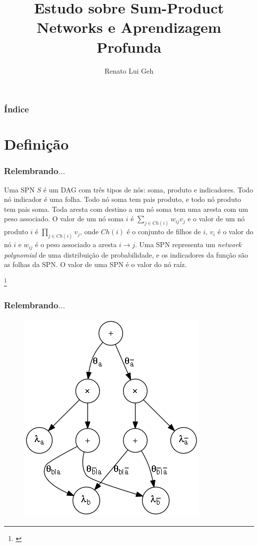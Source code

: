 \documentclass[10pt]{beamer}
\title{Estudo sobre Sum-Product Networks e Aprendizagem Profunda}
\author{Renato Lui Geh}
\institute[IME-USP] {%
  Instituto de Matemática e Estatística\\
  Universidade de São Paulo
}
\newcommand\nmfootnote[1]{%
  \begingroup
  \renewcommand\thefootnote{}\footnote{#1}%
  \addtocounter{footnote}{-1}%
  \endgroup
}
\theoremstyle{plain}
\begin{document}
\frame{\titlepage}

\begin{frame}
  \frametitle{Índice}
  \tableofcontents
\end{frame}


\section{Definição}

\begin{frame}
  \frametitle{Relembrando$\ldots$}
  \begin{definition}\label{pd-def}
    Uma SPN $S$ é um DAG com três tipos de nós: soma, produto e indicadores. Todo nó indicador é uma
    folha. Todo nó soma tem pais produto, e todo nó produto tem pais soma. Toda aresta com destino a
    um nó soma tem uma aresta com um peso associado. O valor de um nó soma $i$ é $\sum_{j\in Ch(i)}
    w_{ij}v_j$ e o valor de um nó produto $i$ é $\prod_{j\in Ch(i)}v_j$, onde $Ch(i)$ é o conjunto
    de filhos de $i$, $v_i$ é o valor do nó $i$ e $w_{ij}$ é o peso associado a aresta $i\to j$. Uma
    SPN representa um \emph{network polynomial} de uma distribuição de probabilidade, e os
    indicadores da função são as folhas da SPN\@. O valor de uma SPN é o valor do nó raíz.
  \end{definition}\nmfootnote{\cite{poon-domingos}}
\end{frame}

\begin{frame}
  \frametitle{Relembrando$\ldots$}
  \begin{figure}[h]
    \centering\includegraphics[scale=0.3]{imgs/simple_spn.png}
  \end{figure}
\end{frame}
\end{document}
